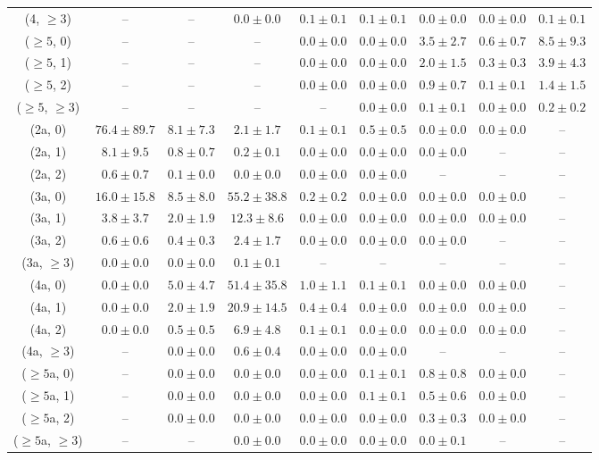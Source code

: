 \begin{table}[h!]
{\begin{tabular}{ccccccccc}
	(4, $\ge3$) & -- & -- & $0.0\pm 0.0$ & $0.1\pm 0.1$ & $0.1\pm 0.1$ & $0.0\pm 0.0$ & $0.0\pm 0.0$ & $0.1\pm 0.1$ \\[0.5ex] 
	($\ge5$, 0) & -- & -- & -- & $0.0\pm 0.0$ & $0.0\pm 0.0$ & $3.5\pm 2.7$ & $0.6\pm 0.7$ & $8.5\pm 9.3$ \\[0.5ex] 
	($\ge5$, 1) & -- & -- & -- & $0.0\pm 0.0$ & $0.0\pm 0.0$ & $2.0\pm 1.5$ & $0.3\pm 0.3$ & $3.9\pm 4.3$ \\[0.5ex] 
	($\ge5$, 2) & -- & -- & -- & $0.0\pm 0.0$ & $0.0\pm 0.0$ & $0.9\pm 0.7$ & $0.1\pm 0.1$ & $1.4\pm 1.5$ \\[0.5ex] 
	($\ge5$, $\ge3$) & -- & -- & -- & -- & $0.0\pm 0.0$ & $0.1\pm 0.1$ & $0.0\pm 0.0$ & $0.2\pm 0.2$ \\[0.5ex] 
	(2a, 0) & $76.4\pm 89.7$ & $8.1\pm 7.3$ & $2.1\pm 1.7$ & $0.1\pm 0.1$ & $0.5\pm 0.5$ & $0.0\pm 0.0$ & $0.0\pm 0.0$ & -- \\[0.5ex] 
	(2a, 1) & $8.1\pm 9.5$ & $0.8\pm 0.7$ & $0.2\pm 0.1$ & $0.0\pm 0.0$ & $0.0\pm 0.0$ & $0.0\pm 0.0$ & -- & -- \\[0.5ex] 
	(2a, 2) & $0.6\pm 0.7$ & $0.1\pm 0.0$ & $0.0\pm 0.0$ & $0.0\pm 0.0$ & $0.0\pm 0.0$ & -- & -- & -- \\[0.5ex] 
	(3a, 0) & $16.0\pm 15.8$ & $8.5\pm 8.0$ & $55.2\pm 38.8$ & $0.2\pm 0.2$ & $0.0\pm 0.0$ & $0.0\pm 0.0$ & $0.0\pm 0.0$ & -- \\[0.5ex] 
	(3a, 1) & $3.8\pm 3.7$ & $2.0\pm 1.9$ & $12.3\pm 8.6$ & $0.0\pm 0.0$ & $0.0\pm 0.0$ & $0.0\pm 0.0$ & $0.0\pm 0.0$ & -- \\[0.5ex] 
	(3a, 2) & $0.6\pm 0.6$ & $0.4\pm 0.3$ & $2.4\pm 1.7$ & $0.0\pm 0.0$ & $0.0\pm 0.0$ & $0.0\pm 0.0$ & -- & -- \\[0.5ex] 
	(3a, $\ge3$) & $0.0\pm 0.0$ & $0.0\pm 0.0$ & $0.1\pm 0.1$ & -- & -- & -- & -- & -- \\[0.5ex] 
	(4a, 0) & $0.0\pm 0.0$ & $5.0\pm 4.7$ & $51.4\pm 35.8$ & $1.0\pm 1.1$ & $0.1\pm 0.1$ & $0.0\pm 0.0$ & $0.0\pm 0.0$ & -- \\[0.5ex] 
	(4a, 1) & $0.0\pm 0.0$ & $2.0\pm 1.9$ & $20.9\pm 14.5$ & $0.4\pm 0.4$ & $0.0\pm 0.0$ & $0.0\pm 0.0$ & $0.0\pm 0.0$ & -- \\[0.5ex] 
	(4a, 2) & $0.0\pm 0.0$ & $0.5\pm 0.5$ & $6.9\pm 4.8$ & $0.1\pm 0.1$ & $0.0\pm 0.0$ & $0.0\pm 0.0$ & $0.0\pm 0.0$ & -- \\[0.5ex] 
	(4a, $\ge3$) & -- & $0.0\pm 0.0$ & $0.6\pm 0.4$ & $0.0\pm 0.0$ & $0.0\pm 0.0$ & -- & -- & -- \\[0.5ex] 
	($\ge5$a, 0) & -- & $0.0\pm 0.0$ & $0.0\pm 0.0$ & $0.0\pm 0.0$ & $0.1\pm 0.1$ & $0.8\pm 0.8$ & $0.0\pm 0.0$ & -- \\[0.5ex] 
	($\ge5$a, 1) & -- & $0.0\pm 0.0$ & $0.0\pm 0.0$ & $0.0\pm 0.0$ & $0.1\pm 0.1$ & $0.5\pm 0.6$ & $0.0\pm 0.0$ & -- \\[0.5ex] 
	($\ge5$a, 2) & -- & $0.0\pm 0.0$ & $0.0\pm 0.0$ & $0.0\pm 0.0$ & $0.0\pm 0.0$ & $0.3\pm 0.3$ & $0.0\pm 0.0$ & -- \\[0.5ex] 
	($\ge5$a, $\ge3$) & -- & -- & $0.0\pm 0.0$ & $0.0\pm 0.0$ & $0.0\pm 0.0$ & $0.0\pm 0.1$ & -- & -- \\[0.5ex] 
	\hline
	\hline
\end{tabular}}
\end{table}
